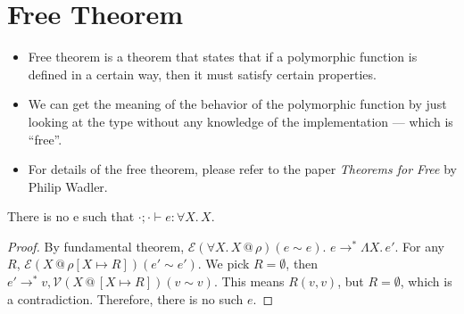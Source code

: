 \documentclass{lecturenotes}
\makeatletter
\newcommand{\fatype}[2]{\ensuremath{\forall #1.\,#2}}
\newcommand{\Abs}[2]{\Lambda #1.\,#2}
\newcommand{\at}{\ensuremath{\mathrel{@}}}
\newcommand{\binval}[4]{\ensuremath{\mathcal{V}(#1 \at #2)(#3 \sim #4)}}
\newcommand{\binexpr}[4]{\ensuremath{\mathcal{E}(#1 \at #2)(#3 \sim #4)}}
\makeatother
\begin{document}
\section{Free Theorem}\label{sec:free-theorem}
\begin{itemize}
    \item Free theorem is a theorem that states that if a polymorphic function is defined in a certain way, then it must satisfy certain properties.
    \item We can get the meaning of the behavior of the polymorphic function by just looking at the type
          without any knowledge of the implementation --- which is ``free''.
    \item For details of the free theorem, please refer to the paper \emph{Theorems for Free} by Philip Wadler.
\end{itemize}
\begin{thm}
    There is no e such that $\cdot; \cdot \vdash e : \fatype{X}{X}$.
\end{thm}
\begin{proof}
    By fundamental theorem, $\binexpr{\fatype{X}{X}}{\rho}{e}{e}$.
    $e \to^\ast \Abs{X}{e'}$. For any $R$, $\binexpr{X}{\rho[X \mapsto R]}{e'}{e'}$.
    We pick $R=\emptyset$, then $e' \to^\ast v, \binval{X}{[X \mapsto R]}{v}{v}$.
    This means $R(v,v)$, but $R=\emptyset$, which is a contradiction.
    Therefore, there is no such $e$.
\end{proof}
\end{document}
